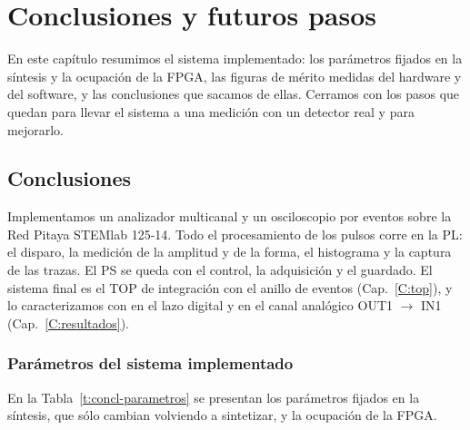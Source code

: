 \chapter{Conclusiones y futuros pasos}
\label{C:conclusiones}

\graphicspath{{figs/cap11/}{figs/comunes/}}

\begin{destacado}
En este capítulo resumimos el sistema implementado: los parámetros fijados en la
síntesis y la ocupación de la FPGA, las figuras de mérito medidas del hardware y
del software, y las conclusiones que sacamos de ellas. Cerramos con los pasos
que quedan para llevar el sistema a una medición con un detector real y para
mejorarlo.
\end{destacado}

\section{Conclusiones}
\label{S:concl}

Implementamos un analizador multicanal y un osciloscopio por eventos sobre la
Red Pitaya STEMlab 125-14. Todo el procesamiento de los pulsos corre en la PL:
el disparo, la medición de la amplitud y de la forma, el histograma y la captura
de las trazas. El PS se queda con el control, la adquisición y el guardado. El
sistema final es el TOP de integración con el anillo de eventos
(Cap.~\ref{C:top}), y lo caracterizamos
con  en el lazo digital y en el canal analógico
OUT1 $\rightarrow$ IN1 (Cap.~\ref{C:resultados}).

\subsection{Parámetros del sistema implementado}
\label{S:concl-parametros}

En la Tabla~\ref{t:concl-parametros} se presentan los parámetros fijados en la
síntesis, que sólo cambian volviendo a sintetizar, y la ocupación de la FPGA.

